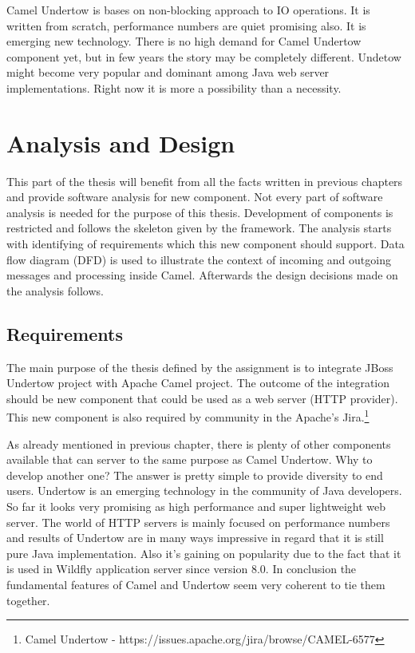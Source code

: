 \documentclass[12pt,final,oneside]{fithesis2}
\begin{document}
Camel Undertow is bases on non-blocking approach to IO operations. It is written from scratch, performance numbers are quiet promising also. It is emerging new technology. There is no high demand for Camel Undertow component yet, but in few years the story may be completely different. Undetow might become very popular and dominant among Java web server implementations. Right now it is more a possibility than a necessity. 

 


\chapter{Analysis and Design}
This part of the thesis will benefit from all the facts written in previous chapters and provide software analysis for new component. Not every part of software analysis is needed for the purpose of this thesis. Development of components is restricted and follows the skeleton given by the framework. The analysis starts with identifying of requirements which this new component should support. Data flow diagram (DFD) is used to illustrate the context of incoming and outgoing messages and processing inside Camel.  Afterwards the design decisions made on the analysis follows.

\section{Requirements}
The main purpose of the thesis defined by the assignment is to integrate JBoss Undertow project with Apache Camel project. The outcome of the integration should be new component that could be used as a web server (HTTP provider). This new component is also required by community in the Apache's Jira.\footnote{Camel Undertow - https://issues.apache.org/jira/browse/CAMEL-6577}

As already mentioned in previous chapter, there is plenty of other components available that can server to the same purpose as Camel Undertow. Why to develop another one? The answer is pretty simple to provide diversity to end users. Undertow is  an emerging technology in the community of Java developers. So far it looks very promising as high performance and super lightweight web server. The world of HTTP servers is mainly focused on performance numbers and results of Undertow are in many ways impressive in regard that it is still pure Java implementation. Also it's gaining on popularity due to the fact that it is used in Wildfly application server since version 8.0. In conclusion the fundamental features of Camel and Undertow seem very coherent to tie them together. 
\end{document}
